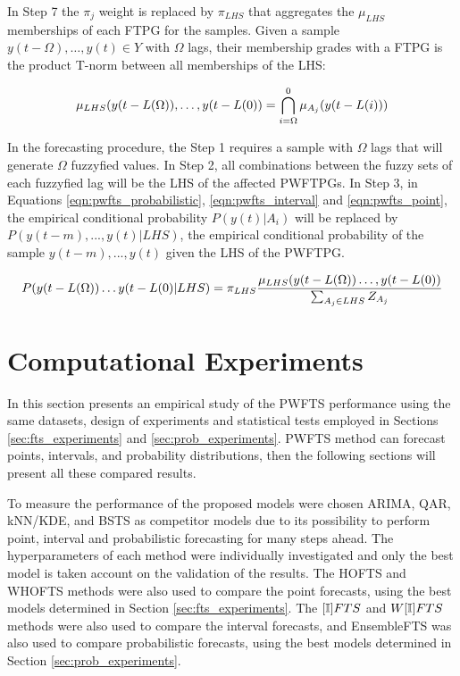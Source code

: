In Step 7 the $\pi_j$ weight is replaced by $\pi_{LHS}$ that aggregates the $\mu_{LHS}$ memberships of each FTPG for the samples. Given a sample $y(t-\Omega),\dots,y(t) \in Y$ with $\Omega$ lags, their membership grades with a FTPG is the product T-norm between all memberships of the LHS: 

\begin{equation}
\displaystyle  \mu_{LHS}(y(t-L(\Omega)),\ldots,y(t-L(0)) = \bigcap_{i = \Omega}^0 \mu_{A_j}(y(t-L(i)))
\label{eqn:extension_highorder_mu}
\end{equation}

In the forecasting procedure, the Step 1 requires a sample with $\Omega$ lags that will generate $\Omega$ fuzzyfied values. In Step 2, all combinations between the fuzzy sets of each fuzzyfied lag will be the LHS of the affected PWFTPGs. In Step 3, in Equations \ref{eqn:pwfts_probabilistic}, \ref{eqn:pwfts_interval} and \ref{eqn:pwfts_point}, the empirical conditional probability $P(y(t)|A_i)$ will be replaced by $P(y(t-m),...,y(t) | LHS)$, the empirical conditional probability of the sample $y(t-m),...,y(t)$ given the LHS of the PWFTPG.

\begin{equation}
\displaystyle P(y(t-L(\Omega))\ldots y(t-L(0) | LHS) = \pi_{LHS} \frac{\mu_{LHS}(y(t-L(\Omega))\ldots,y(t-L(0))}{\sum_{A_j \in LHS} Z_{A_j}}
\label{eqn:extension_highorder}
\end{equation}



\section{Computational Experiments}
\label{sec:pwfts_experiments}

In this section presents an empirical study of the PWFTS performance using the same datasets, design of experiments and statistical tests employed in Sections \ref{sec:fts_experiments} and \ref{sec:prob_experiments}. PWFTS method can forecast points, intervals, and probability distributions, then the following sections will present all these compared results.

To measure the performance of the proposed models were chosen ARIMA, QAR, kNN/KDE, and BSTS as competitor models due to its possibility to perform point, interval and probabilistic forecasting for many steps ahead. The hyperparameters of each method were individually investigated and only the best model is taken account on the validation of the results. The HOFTS and WHOFTS methods were also used to compare the point forecasts, using the best models determined in Section \ref{sec:fts_experiments}. The $[\mathbb{I}]FTS$ and $W[\mathbb{I}]FTS$ methods were also used to compare the interval forecasts, and EnsembleFTS was also used to compare probabilistic forecasts, using the best models determined in Section \ref{sec:prob_experiments}.

